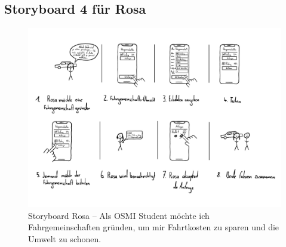 \documentclass{article}
\begin{document}
\begin{landscape}
	\newpage

	\subsection{Storyboard 4 für Rosa}

	\begin{figure}[h!]
		\includegraphics[height=0.7\textheight]{storyboard-4-rosa}
		\centering
		\caption{Storyboard Rosa – Als OSMI Student möchte ich Fahrgemeinschaften gründen, um mir Fahrtkosten zu sparen und die Umwelt zu schonen.}
	\end{figure}
\end{landscape}
\end{document}

